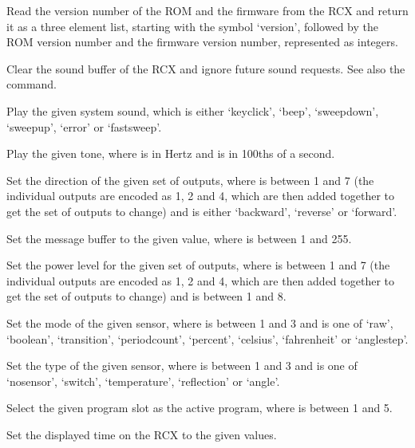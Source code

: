   Read the version number of the ROM and the firmware from the RCX and return it as a three element list, starting
  with the symbol `version', followed by the ROM version number and the firmware version number, represented as integers.
  
  Clear the sound buffer of the RCX and ignore future sound requests.
  See also the  command.
  
  Play the given system sound, which is either `keyclick', `beep', `sweepdown', `sweepup', `error' or `fast\-sweep'.
  
  Play the given tone, where  is in Hertz and  is in 100ths of a second.
  
  Set the direction of the given set of outputs, where  is between 1 and 7
  (the individual outputs are encoded as 1, 2 and 4, which are then added together to get the set of outputs to change) and
   is either `backward', `reverse' or `forward'.
  
  Set the message buffer to the given value, where  is between 1 and 255.
  
  Set the power level for the given set of outputs, where  is between 1 and 7
  (the individual outputs are encoded as 1, 2 and 4, which are then added together to get the set of outputs to change) and
   is between 1 and 8.
  
  Set the mode of the given sensor, where  is between 1 and 3 and  is one of `raw', `boolean',
  `transition', `periodcount', `percent', `celsius', `fahrenheit' or `anglestep'.
  
  Set the type of the given sensor, where  is between 1 and 3 and  is one of `nosensor',
  `switch', `temperature', `reflection' or `angle'.
  
  Select the given program slot as the active program, where  is between 1 and 5.
  
  Set the displayed time on the RCX to the given values.
  
